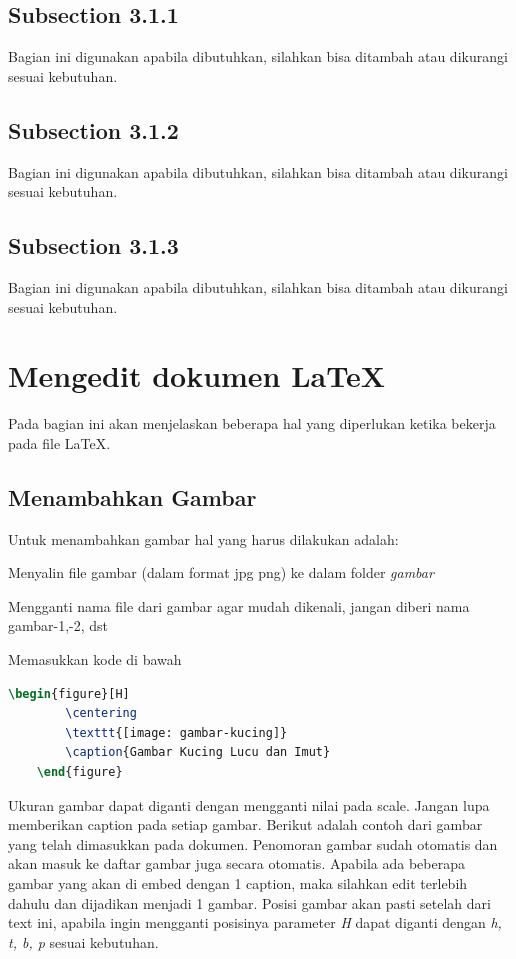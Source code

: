 \subsection{Subsection 3.1.1}
Bagian ini digunakan apabila dibutuhkan, silahkan bisa ditambah atau dikurangi sesuai kebutuhan.

\subsection{Subsection 3.1.2}
Bagian ini digunakan apabila dibutuhkan, silahkan bisa ditambah atau dikurangi sesuai kebutuhan.

\subsection{Subsection 3.1.3}
Bagian ini digunakan apabila dibutuhkan, silahkan bisa ditambah atau dikurangi sesuai kebutuhan.

\section{Mengedit dokumen \LaTeX}
Pada bagian ini akan menjelaskan beberapa hal yang diperlukan ketika bekerja pada file \LaTeX.

\subsection{Menambahkan Gambar}
Untuk menambahkan gambar hal yang harus dilakukan adalah:
\begin{packed_enum}
    \item Menyalin file gambar (dalam format jpg \/ png) ke dalam folder \textit{gambar}
    \item Mengganti nama file dari gambar agar mudah dikenali, jangan diberi nama gambar-1,-2, dst
    \item Memasukkan kode di bawah
\end{packed_enum}

\begin{lstlisting}[language=TeX]
    \begin{figure}[H]
        \centering
        \texttt{[image: gambar-kucing]}
        \caption{Gambar Kucing Lucu dan Imut}
    \end{figure}
\end{lstlisting}

Ukuran gambar dapat diganti dengan mengganti nilai pada scale. Jangan lupa memberikan caption pada setiap gambar. Berikut adalah contoh dari gambar yang telah dimasukkan pada dokumen. Penomoran gambar sudah otomatis dan akan masuk ke daftar gambar juga secara otomatis. Apabila ada beberapa gambar yang akan di embed dengan 1 caption, maka silahkan edit terlebih dahulu dan dijadikan menjadi 1 gambar. Posisi gambar akan pasti setelah dari text ini, apabila ingin mengganti posisinya parameter \textit{H} dapat diganti dengan \textit{h, t, b, p} sesuai kebutuhan.

